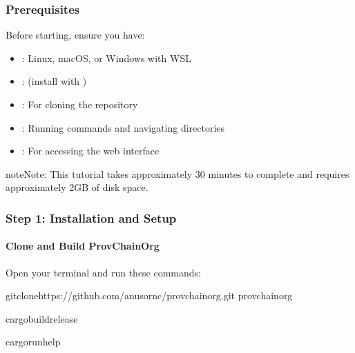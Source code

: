 \documentclass[letterpaper,10pt,english]{sphinxmanual}
\begin{document}
\subsubsection{Prerequisites}
\label{\detokenize{user-guide/first-steps:prerequisites}}
\sphinxAtStartPar
Before starting, ensure you have:
\begin{itemize}
\item {} 
\sphinxAtStartPar
{}: Linux, macOS, or Windows with WSL

\item {} 
\sphinxAtStartPar
{}:  (install with )

\item {} 
\sphinxAtStartPar
{}: For cloning the repository

\item {} 
\sphinxAtStartPar
{}: Running commands and navigating directories

\item {} 
\sphinxAtStartPar
{}: For accessing the web interface

\end{itemize}

\begin{sphinxadmonition}{note}{Note:}
\sphinxAtStartPar
This tutorial takes approximately 30 minutes to complete and requires approximately 2GB of disk space.
\end{sphinxadmonition}


\subsubsection{Step 1: Installation and Setup}
\label{\detokenize{user-guide/first-steps:step-1-installation-and-setup}}

\paragraph{Clone and Build ProvChainOrg}
\label{\detokenize{user-guide/first-steps:clone-and-build-provchainorg}}
\sphinxAtStartPar
Open your terminal and run these commands:

\begin{sphinxVerbatim}[commandchars=\\\{\}]
gitclonehttps://github.com/anusornc/provchain\PYGZhy{}org.git
provchain\PYGZhy{}org

cargobuild\PYGZhy{}\PYGZhy{}release

cargorun\PYGZhy{}\PYGZhy{}\PYGZhy{}\PYGZhy{}help
\end{sphinxVerbatim}
\end{document}
